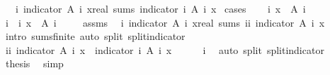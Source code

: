\begin{isabellebody}
\ \ \ {\isachardoublequoteopen}{\isacharparenleft}{\isasymlambda}i{\isachardot}\ indicator\ {\isacharparenleft}A\ i{\isacharparenright}\ x{\isacharcolon}{\isacharcolon}real{\isacharparenright}\ sums\ indicator\ {\isacharparenleft}{\isasymUnion}i{\isachardot}\ A\ i{\isacharparenright}\ x{\isachardoublequoteclose}\isanewline
%
\isadelimproof
%
\endisadelimproof
%
\isatagproof
{}\isamarkupfalse%
\ cases\isanewline
\ \ \isamarkupfalse%
\ {\isachardoublequoteopen}{\isasymexists}i{\isachardot}\ x\ {\isasymin}\ A\ i{\isachardoublequoteclose}\isanewline
\ \ \isamarkupfalse%
\ \isamarkupfalse%
\ i\ \ i{\isacharcolon}\ {\isachardoublequoteopen}x\ {\isasymin}\ A\ i{\isachardoublequoteclose}\ \isacommand{{\isachardot}{\isachardot}}\isamarkupfalse%
\isanewline
\ \ \isamarkupfalse%
\ assms\ \isamarkupfalse%
\ {\isachardoublequoteopen}{\isacharparenleft}{\isasymlambda}i{\isachardot}\ indicator\ {\isacharparenleft}A\ i{\isacharparenright}\ x{\isacharcolon}{\isacharcolon}real{\isacharparenright}\ sums\ {\isacharparenleft}{\isasymSum}i{\isasymin}{\isacharbraceleft}i{\isacharbraceright}{\isachardot}\ indicator\ {\isacharparenleft}A\ i{\isacharparenright}\ x{\isacharparenright}{\isachardoublequoteclose}\isanewline
\ \ \ \ \isamarkupfalse%
\ {\isacharparenleft}intro\ sums{\isacharunderscore}finite{\isacharparenright}\ {\isacharparenleft}auto\ split{\isacharcolon}\ split{\isacharunderscore}indicator{\isacharparenright}\isanewline
\ \ \isamarkupfalse%
\ \isamarkupfalse%
\ {\isachardoublequoteopen}{\isacharparenleft}{\isasymSum}i{\isasymin}{\isacharbraceleft}i{\isacharbraceright}{\isachardot}\ indicator\ {\isacharparenleft}A\ i{\isacharparenright}\ x{\isacharparenright}\ {\isacharequal}\ indicator\ {\isacharparenleft}{\isasymUnion}i{\isachardot}\ A\ i{\isacharparenright}\ x{\isachardoublequoteclose}\isanewline
\ \ \ \ \isamarkupfalse%
\ i\ \isamarkupfalse%
\ {\isacharparenleft}auto\ split{\isacharcolon}\ split{\isacharunderscore}indicator{\isacharparenright}\isanewline
\ \ \isamarkupfalse%
\ \isamarkupfalse%
\ {\isacharquery}thesis\ \isacommand{{\isachardot}}\isamarkupfalse%
\isanewline
{}\isamarkupfalse%
\ simp%
\endisatagproof
{\isafoldproof}%
%
\isadelimproof
\isanewline
%
\endisadelimproof
%
\isadelimtheory
\isanewline
%
\endisadelimtheory
%
\isatagtheory
{}\isamarkupfalse%
%
\endisatagtheory
{\isafoldtheory}%
%
\isadelimtheory
%
\endisadelimtheory
\end{isabellebody}%
